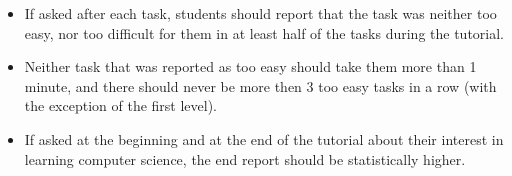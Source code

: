 \begin{itemize}
\item If asked after each task, students should report that the task was
  neither too easy, nor too difficult for them in at least half of the tasks
  during the tutorial.  %
\item Neither task that was reported as too easy should take them
  more than 1 minute, and there should never be more then 3 too easy tasks
  in a row (with the exception of the first level).
\item If asked at the beginning and at the end of the tutorial about their
  interest in learning computer science, the end report should be statistically
  higher.
\end{itemize}



